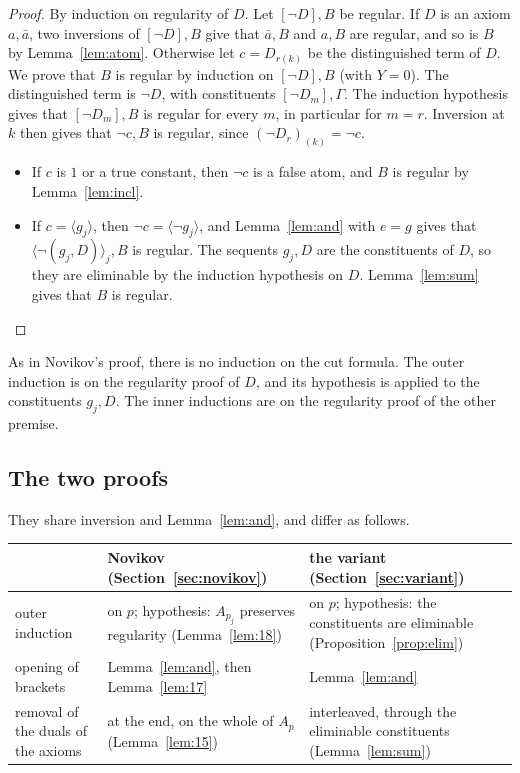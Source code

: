 \documentclass[11pt]{amsart}
\theoremstyle{definition}
\theoremstyle{remark}
\newcommand{\seq}[1]{\langle #1\rangle}
\newcommand{\one}[1]{[#1]}
\begin{document}
\begin{proof}
  By induction on regularity of $D$. Let $\one{\neg D},B$ be regular. If
  $D$ is an axiom $a,\bar a$, two inversions of $\one{\neg D},B$ give that
  $\bar a,B$ and $a,B$ are regular, and so is $B$ by
  Lemma~\ref{lem:atom}. Otherwise let $c=D_{r(k)}$ be the distinguished
  term of $D$. We prove that $B$ is
  regular by induction on $\one{\neg D},B$ (with $Y=0$). The distinguished
  term is $\neg D$, with constituents $\one{\neg D_m},\Gamma$. The
  induction hypothesis gives that $\one{\neg D_m},B$ is regular for every
  $m$, in particular for $m=r$. Inversion at $k$ then gives that
  $\neg c,B$ is regular, since $(\neg D_r)_{(k)}=\neg c$.
  \begin{itemize}
  \item If $c$ is $1$ or a true constant, then $\neg c$ is a false atom, and $B$
    is regular by Lemma~\ref{lem:incl}.
  \item If $c=\seq{g_j}$, then $\neg c=\seq{\neg g_j}$, and Lemma~\ref{lem:and}
    with $e=g$ gives that $\seq{\neg(g_j,D)}_j,B$ is regular. The sequents
    $g_j,D$ are the constituents of $D$, so they are eliminable by the
    induction hypothesis on $D$. Lemma~\ref{lem:sum} gives that $B$ is
    regular.\qedhere
  \end{itemize}
\end{proof}

As in Novikov's proof, there is no induction on the cut formula. The
outer induction is on the regularity proof of $D$, and its hypothesis is
applied to the constituents $g_j,D$. The inner inductions are on the
regularity proof of the other premise.

\subsection*{The two proofs}
They share inversion and Lemma~\ref{lem:and}, and differ as follows.

\medskip
\noindent
\begin{tabular}{@{}>{\raggedright\arraybackslash}p{}>{\raggedright\arraybackslash}p{}>{\raggedright\arraybackslash}p{}@{}}
\toprule
& Novikov (Section~\ref{sec:novikov}) & the variant (Section~\ref{sec:variant}) \\
\midrule
outer induction & on $p$; hypothesis: $A_{p_j}$ preserves regularity
  (Lemma~\ref{lem:18}) & on $p$; hypothesis: the constituents are
  eliminable (Proposition~\ref{prop:elim}) \\
\addlinespace
opening of brackets & Lemma~\ref{lem:and}, then Lemma~\ref{lem:17} &
  Lemma~\ref{lem:and} \\
\addlinespace
removal of the duals of the axioms & at the end, on the whole of $A_p$
  (Lemma~\ref{lem:15}) & interleaved, through the eliminable constituents
  (Lemma~\ref{lem:sum}) \\
\bottomrule
\end{tabular}
\medskip
\end{document}
